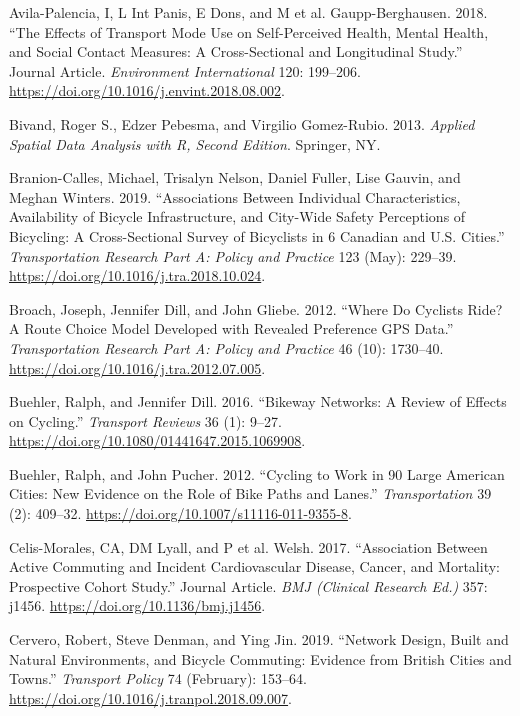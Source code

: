 \documentclass[smallextended]{svjour3}       %
\begin{document}
\leavevmode\hypertarget{ref-Avila2018}{}%
Avila-Palencia, I, L Int Panis, E Dons, and M et al. Gaupp-Berghausen.
2018. ``The Effects of Transport Mode Use on Self-Perceived Health,
Mental Health, and Social Contact Measures: A Cross-Sectional and
Longitudinal Study.'' Journal Article. \emph{Environment International}
120: 199--206. \url{https://doi.org/10.1016/j.envint.2018.08.002}.

\leavevmode\hypertarget{ref-Bivand2013}{}%
Bivand, Roger S., Edzer Pebesma, and Virgilio Gomez-Rubio. 2013.
\emph{Applied Spatial Data Analysis with R, Second Edition}. Springer,
NY.

\leavevmode\hypertarget{ref-Branion2019}{}%
Branion-Calles, Michael, Trisalyn Nelson, Daniel Fuller, Lise Gauvin,
and Meghan Winters. 2019. ``Associations Between Individual
Characteristics, Availability of Bicycle Infrastructure, and City-Wide
Safety Perceptions of Bicycling: A Cross-Sectional Survey of Bicyclists
in 6 Canadian and U.S. Cities.'' \emph{Transportation Research Part A:
Policy and Practice} 123 (May): 229--39.
\url{https://doi.org/10.1016/j.tra.2018.10.024}.

\leavevmode\hypertarget{ref-Broach2012}{}%
Broach, Joseph, Jennifer Dill, and John Gliebe. 2012. ``Where Do
Cyclists Ride? A Route Choice Model Developed with Revealed Preference
GPS Data.'' \emph{Transportation Research Part A: Policy and Practice}
46 (10): 1730--40. \url{https://doi.org/10.1016/j.tra.2012.07.005}.

\leavevmode\hypertarget{ref-Buehler2016}{}%
Buehler, Ralph, and Jennifer Dill. 2016. ``Bikeway Networks: A Review of
Effects on Cycling.'' \emph{Transport Reviews} 36 (1): 9--27.
\url{https://doi.org/10.1080/01441647.2015.1069908}.

\leavevmode\hypertarget{ref-Buehler2012}{}%
Buehler, Ralph, and John Pucher. 2012. ``Cycling to Work in 90 Large
American Cities: New Evidence on the Role of Bike Paths and Lanes.''
\emph{Transportation} 39 (2): 409--32.
\url{https://doi.org/10.1007/s11116-011-9355-8}.

\leavevmode\hypertarget{ref-Celis2017}{}%
Celis-Morales, CA, DM Lyall, and P et al. Welsh. 2017. ``Association
Between Active Commuting and Incident Cardiovascular Disease, Cancer,
and Mortality: Prospective Cohort Study.'' Journal Article. \emph{BMJ
(Clinical Research Ed.)} 357: j1456.
\url{https://doi.org/10.1136/bmj.j1456}.

\leavevmode\hypertarget{ref-Cervero2019}{}%
Cervero, Robert, Steve Denman, and Ying Jin. 2019. ``Network Design,
Built and Natural Environments, and Bicycle Commuting: Evidence from
British Cities and Towns.'' \emph{Transport Policy} 74 (February):
153--64. \url{https://doi.org/10.1016/j.tranpol.2018.09.007}.
\end{document}
